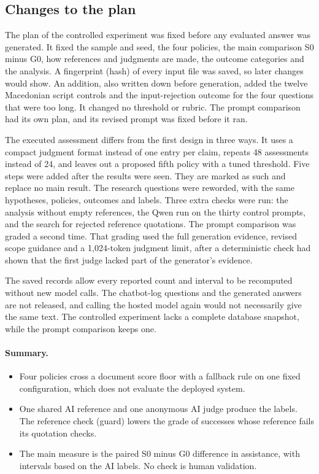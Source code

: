 \subsection{Changes to the plan}
\label{sec:method-deviations}

The plan of the controlled experiment was fixed before any evaluated answer was generated. It fixed the sample and seed, the four policies, the main comparison S0 minus G0, how references and judgments are made, the outcome categories and the analysis. A fingerprint (hash) of every input file was saved, so later changes would show. An addition, also written down before generation, added the twelve Macedonian script controls and the input-rejection outcome for the four questions that were too long. It changed no threshold or rubric. The prompt comparison had its own plan, and its revised prompt was fixed before it ran.

The executed assessment differs from the first design in three ways. It uses a compact judgment format instead of one entry per claim, repeats 48 assessments instead of 24, and leaves out a proposed fifth policy with a tuned threshold. Five steps were added after the results were seen. They are marked as such and replace no main result. The research questions were reworded, with the same hypotheses, policies, outcomes and labels. Three extra checks were run: the analysis without empty references, the Qwen run on the thirty control prompts, and the search for rejected reference quotations. The prompt comparison was graded a second time. That grading used the full generation evidence, revised scope guidance and a 1,024-token judgment limit, after a deterministic check had shown that the first judge lacked part of the generator's evidence.

The saved records allow every reported count and interval to be recomputed without new model calls. The chatbot-log questions and the generated answers are not released, and calling the hosted model again would not necessarily give the same text. The controlled experiment lacks a complete database snapshot, while the prompt comparison keeps one.

\paragraph{Summary.}
\begin{itemize}
  \item Four policies cross a document score floor with a fallback rule on one fixed configuration, which does not evaluate the deployed system.
  \item One shared AI reference and one anonymous AI judge produce the labels. The reference check (guard) lowers the grade of successes whose reference fails its quotation checks.
  \item The main measure is the paired S0 minus G0 difference in assistance, with intervals based on the AI labels. No check is human validation.
\end{itemize}
